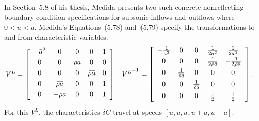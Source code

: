In Section~5.8 of his thesis, Medida presents two such concrete nonreflecting
boundary condition specifications for subsonic inflows and outflows where $0 <
\bar{u} < \bar{a}$.  Medida's Equations~(5.78) and~(5.79) specify the
transformations to and from characteristic variables:
\begin{align}
\label{eq:dimeulerapproxmedidaproj}
  V^L &= \left[\begin{array}{ccccc}
    -\bar{a}^2 & 0                   & 0                  & 0                  & 1 \\ \noalign{\smallskip}
    0          & 0                   & \bar{\rho} \bar{a} & 0                  & 0 \\ \noalign{\smallskip}
    0          & 0                   & 0                  & \bar{\rho} \bar{a} & 0 \\ \noalign{\smallskip}
    0          & \bar{\rho} \bar{a}  & 0                  & 0                  & 1 \\ \noalign{\smallskip}
    0          & -\bar{\rho} \bar{a} & 0                  & 0                  & 1 \\ \noalign{\smallskip}
  \end{array}\right]
&
  {V^L}^{-1} &= \left[\begin{array}{ccccc}
    -\frac{1}{\bar{a}^2} & 0                            & 0                            & \frac{1}{2\bar{a}^2}          & \frac{1}{2\bar{a}^2}            \\ \noalign{\smallskip}
    0                    & 0                            & 0                            & \frac{1}{2\bar{\rho} \bar{a}} & - \frac{1}{2\bar{\rho} \bar{a}} \\ \noalign{\smallskip}
    0                    & \frac{1}{\bar{\rho} \bar{a}} & 0                            & 0                             & 0                               \\ \noalign{\smallskip}
    0                    & 0                            & \frac{1}{\bar{\rho} \bar{a}} & 0                             & 0                               \\ \noalign{\smallskip}
    0                    & 0                            & 0                            & \frac{1}{2}                   & \frac{1}{2}                     \\ \noalign{\smallskip}
  \end{array}\right].
\end{align}
For this $V^L$, the characteristics $\delta{}C$ travel at speeds
$\left[\bar{u}, \bar{u}, \bar{u}, \bar{u}+\bar{a}, \bar{u}-\bar{a}\right]$.
